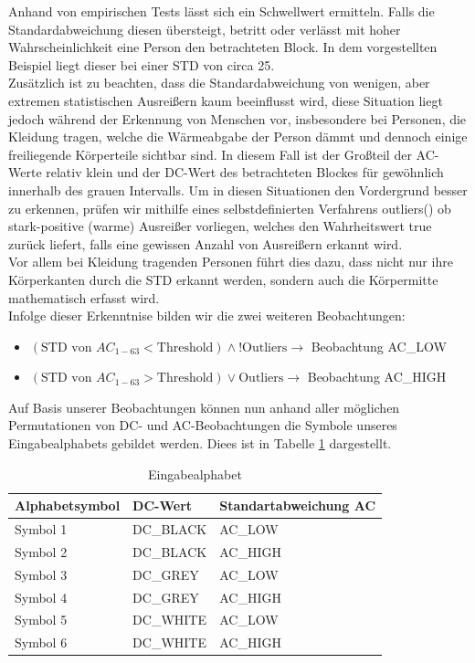 Anhand von empirischen Tests lässt sich ein Schwellwert ermitteln.
Falls die Standardabweichung diesen übersteigt, betritt oder verlässt mit hoher Wahrscheinlichkeit eine Person den betrachteten Block.
In dem vorgestellten Beispiel liegt dieser bei einer STD von circa 25.\\
Zusätzlich ist zu beachten, dass die Standardabweichung von wenigen, aber extremen statistischen Ausreißern kaum beeinflusst wird, diese Situation liegt  jedoch während der Erkennung von Menschen vor, insbesondere bei Personen, die Kleidung tragen, welche die Wärmeabgabe der Person dämmt und dennoch einige freiliegende Körperteile sichtbar sind.
In diesem Fall ist der Großteil der AC-Werte relativ klein und der DC-Wert des betrachteten Blockes für gewöhnlich innerhalb des grauen Intervalls.
Um in diesen Situationen den Vordergrund besser zu erkennen, prüfen wir mithilfe eines selbstdefinierten Verfahrens outliers() ob stark-positive (warme) Ausreißer vorliegen, welches den Wahrheitswert true zurück liefert, falls eine gewissen Anzahl von Ausreißern erkannt wird.\\
Vor allem bei Kleidung tragenden Personen führt dies dazu, dass nicht nur ihre Körper\-kanten durch die STD erkannt werden, sondern auch die Körpermitte mathematisch erfasst wird.\\
Infolge dieser Erkenntnise bilden wir die zwei weiteren Beobachtungen:
\begin{itemize}
	\item $(\text{STD von }AC_{1-63} < \text{Threshold} ) \wedge !\text{Outliers} \rightarrow$  Beobachtung AC\_LOW
	\item $(\text{STD von }AC_{1-63} > \text{Threshold} ) \vee \text{Outliers} \rightarrow$  Beobachtung AC\_HIGH
\end{itemize}
Auf Basis unserer Beobachtungen können nun anhand aller möglichen Permutationen von DC- und AC-Beobachtungen die Symbole unseres Eingabealphabets gebildet werden. Diees ist in Tabelle \ref{table:eingabealphabet} dargestellt.
\begin{table}
	\label{table:eingabealphabet}
	\begin{center}
\begin{tabular}{|l|l|l|}
\hline
\textbf{Alphabetsymbol}&\textbf{DC-Wert}&\textbf{Standartabweichung AC}\\
\hline
Symbol 1&DC\_BLACK&AC\_LOW\\
\hline
Symbol 2&DC\_BLACK&AC\_HIGH\\
\hline
Symbol 3&DC\_GREY&AC\_LOW\\
\hline
Symbol 4&DC\_GREY&AC\_HIGH\\
\hline
Symbol 5&DC\_WHITE&AC\_LOW\\
\hline
Symbol 6&DC\_WHITE&AC\_HIGH\\
\hline
\end{tabular}
	\caption{Eingabealphabet}
\end{center}
\end{table}

